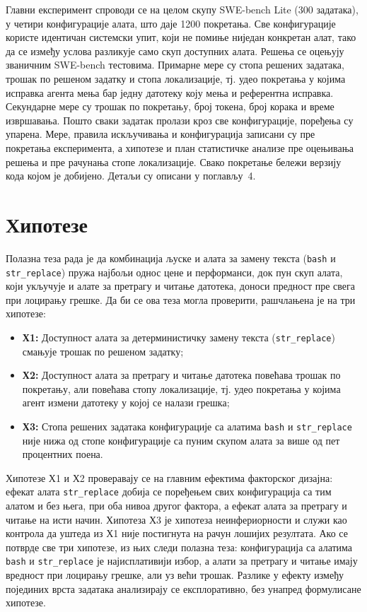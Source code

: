 \documentclass[12pt,a4paper]{report}
\begin{document}
	Главни експеримент спроводи се на целом скупу SWE-bench Lite (300 задатака),
	у четири конфигурације алата, што даје 1200 покретања. Све конфигурације
	користе идентичан системски упит, који не помиње ниједан конкретан алат,
	тако да се између услова разликује само скуп доступних алата. Решења се
	оцењују званичним SWE-bench тестовима. Примарне мере су стопа решених
	задатака, трошак по решеном задатку и стопа локализације, тј. удео
	покретања у којима исправка агента мења бар једну датотеку коју мења и
	референтна исправка. Секундарне мере су трошак по покретању, број токена,
	број корака и време извршавања. Пошто сваки задатак пролази кроз све
	конфигурације, поређења су упарена. Мере, правила искључивања и
	конфигурација записани су пре покретања експеримента, а хипотезе и план
	статистичке анализе пре оцењивања решења и пре рачунања стопе
	локализације. Свако покретање бележи верзију кода којом је добијено. Детаљи су описани у
	поглављу~4.

	\section{Хипотезе}

	Полазна теза рада је да комбинација љуске и алата за замену текста
	(\texttt{bash} и \texttt{str\_replace}) пружа најбољи однос цене и
	перформанси, док пун скуп алата, који укључује и алате за претрагу и читање
	датотека, доноси предност пре свега при лоцирању грешке. Да би се ова теза
	могла проверити, рашчлањена је на три хипотезе:

	\begin{itemize}
		\item \textbf{Х1:} Доступност алата за детерминистичку замену текста
		(\texttt{str\_replace}) смањује трошак по решеном задатку;
		\item \textbf{Х2:} Доступност алата за претрагу и читање датотека
		повећава трошак по покретању, али повећава стопу локализације, тј. удео
		покретања у којима агент измени датотеку у којој се налази грешка;
		\item \textbf{Х3:} Стопа решених задатака конфигурације са алатима
		\texttt{bash} и \texttt{str\_replace} није нижа од стопе конфигурације са
		пуним скупом алата за више од пет процентних поена.
	\end{itemize}

	Хипотезе Х1 и Х2 проверавају се на главним ефектима факторског дизајна:
	ефекат алата \texttt{str\_replace} добија се поређењем свих конфигурација са
	тим алатом и без њега, при оба нивоа другог фактора, а ефекат алата за
	претрагу и читање на исти начин. Хипотеза Х3 је хипотеза неинфериорности и
	служи као контрола да уштеда из Х1 није постигнута на рачун лошијих
	резултата. Ако се потврде све три хипотезе, из њих следи полазна теза:
	конфигурација са алатима \texttt{bash} и \texttt{str\_replace} је
	најисплативији избор, а алати за претрагу и читање имају вредност при
	лоцирању грешке, али уз већи трошак. Разлике у ефекту између појединих
	врста задатака анализирају се експлоративно, без унапред формулисане
	хипотезе.
\end{document}
